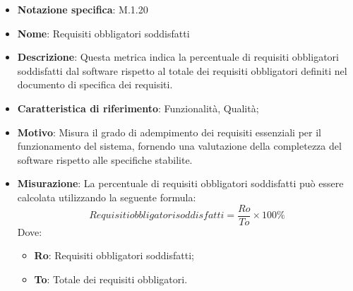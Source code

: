 \begin{itemize}
    \item \textbf{Notazione specifica}: M.1.20
    \item \textbf{Nome}: Requisiti obbligatori soddisfatti
    \item \textbf{Descrizione}: Questa metrica indica la percentuale di requisiti obbligatori soddisfatti dal software rispetto al totale dei requisiti obbligatori definiti nel documento di specifica dei requisiti.
    \item \textbf{Caratteristica di riferimento}: Funzionalità, Qualità;
    \item \textbf{Motivo}: Misura il grado di adempimento dei requisiti essenziali per il funzionamento del sistema, fornendo una valutazione della completezza del software rispetto alle specifiche stabilite.
    \item \textbf{Misurazione}: La percentuale di requisiti obbligatori soddisfatti può essere calcolata utilizzando la seguente formula:
    \[ Requisiti obbligatori soddisfatti= \frac{Ro}{To} \times 100\% \]
    Dove:
    \begin{itemize}
        \item \textbf{Ro}: Requisiti obbligatori soddisfatti;
        \item \textbf{To}: Totale dei requisiti obbligatori.
    \end{itemize}
\end{itemize}
